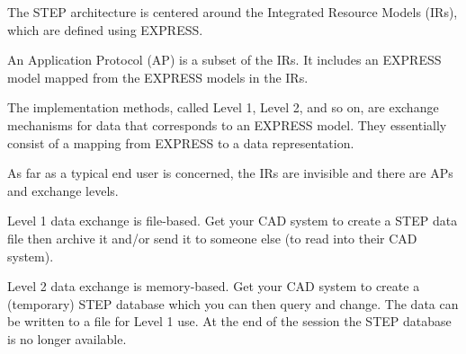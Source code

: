 \begin{remarks}
\remintro


    The STEP architecture is centered around the Integrated Resource 
Models (IRs), which are defined using EXPRESS.

   An Application Protocol (AP) is a subset of the IRs. It includes an EXPRESS 
model mapped from the EXPRESS models in the IRs.

   The implementation methods, called Level 1, Level 2, and so on, are exchange
mechanisms for data that corresponds to an EXPRESS model. They essentially
consist of a mapping from EXPRESS to a data representation.

    As far as a typical end user is concerned, the IRs are invisible and there
are APs and exchange levels.

\remend
\end{remarks}

\normalsize
%
%
%
%
\begin{figure}[hp]
\centering

\end{figure}
\bodsiz


\begin{remarks}
\remintro


   Level 1 data exchange is file-based. Get your CAD system to create a
STEP data file then archive it and/or send it to someone else (to read into
their CAD system).

\remend
\end{remarks}

\normalsize
%
%
%
%
\begin{figure}[hp]
\centering

\end{figure}
\bodsiz

\begin{remarks}
\remintro


   Level 2 data exchange is memory-based. Get your CAD system to create a
(temporary) STEP database which you can then query and change. The data
can be written to a file for Level 1 use. At the end of the session
the STEP database is no longer available.

\remend
\end{remarks}

